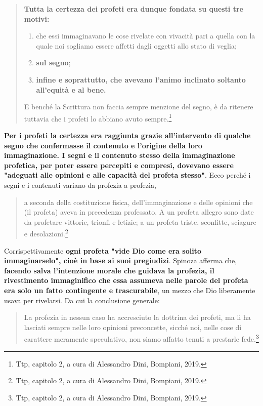\begin{quotation}
	\small \textbf{Tutta la certezza dei profeti era dunque fondata su questi tre motivi: }
	\begin{enumerate}
		\item che essi
		immaginavano le cose rivelate con vivacità pari a quella con la quale noi sogliamo essere affetti
		dagli oggetti allo stato di veglia;
		\item \textbf{sul segno};
		\item \textbf{infine e soprattutto, che avevano l'animo inclinato
		soltanto all'equità e al bene.}
	\end{enumerate}
	
	E benché la Scrittura non faccia sempre menzione del segno, è da
	ritenere tuttavia che i profeti lo abbiano avuto sempre.\footnote{Ttp, capitolo 2, a cura di Alessandro Dini, Bompiani, 2019.}
\end{quotation}

\textbf{Per i profeti la certezza era raggiunta
 grazie all'intervento di qualche segno che confermasse il contenuto e l'origine della loro
immaginazione. I segni e il contenuto stesso della
immaginazione profetica, per poter essere percepiti e compresi, dovevano essere "adeguati alle
opinioni e alle capacità del profeta stesso"}. Ecco perché i segni e i contenuti variano da profezia a
profezia, 

\begin{quotation}
	\small a seconda della costituzione fisica, dell'immaginazione e delle opinioni che (il profeta)
	aveva in precedenza professato. A un profeta allegro sono date da profetare vittorie, trionfi e
	letizie; a un profeta triste, sconfitte, sciagure e desolazioni.\footnote{Ttp, capitolo 2, a cura di Alessandro Dini, Bompiani, 2019.}
\end{quotation}

Corrispettivamente \textbf{ogni profeta "vide Dio come era solito immaginarselo", cioè in base ai suoi
pregiudizi}. Spinoza afferma che, \textbf{facendo salva l'intenzione morale che guidava la profezia, il rivestimento immaginifico che essa assumeva nelle parole del profeta era solo un
fatto contingente e trascurabile}, un mezzo che Dio liberamente usava per rivelarsi. Da cui la
conclusione generale: 

\begin{quotation}
	\small La profezia in nessun caso ha accresciuto la dottrina dei profeti, ma li ha
	lasciati sempre nelle loro opinioni preconcette, sicché noi, nelle cose di carattere meramente
	speculativo, non siamo affatto tenuti a prestarle fede.\footnote{Ttp, capitolo 2, a cura di Alessandro Dini, Bompiani, 2019.}
\end{quotation}

